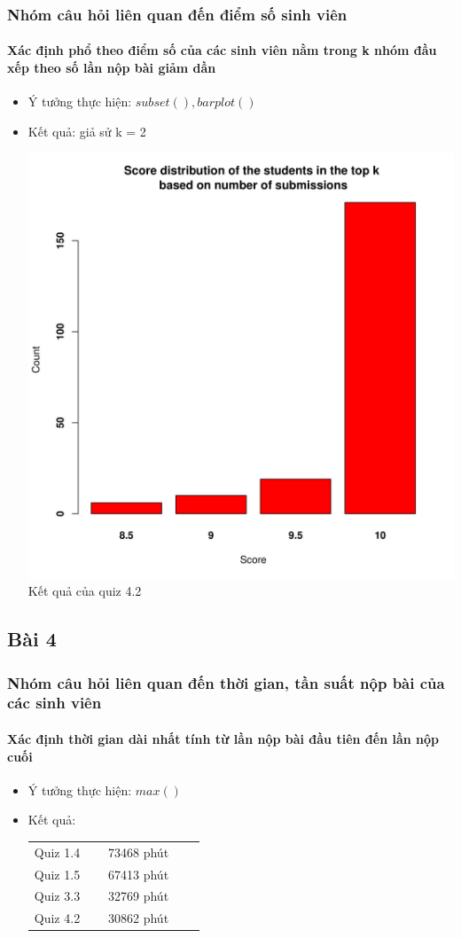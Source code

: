 \documentclass[english,10pt,table]{beamer}
\begin{document}
\frame
{
\frametitle{Nhóm câu hỏi liên quan đến điểm số sinh viên}
\framesubtitle{Xác định phổ theo điểm số của các sinh viên nằm trong k nhóm đầu xếp theo số lần nộp bài giảm dần}
\begin{itemize}
    \item Ý tưởng thực hiện: $subset(), barplot()$
    \item Kết quả: giả sử k = 2\\
    \begin{center}
        \includegraphics[width = 6 cm]{Images/img3-6-4.png}\\
        Kết quả của quiz 4.2
    \end{center}
\end{itemize}
}

\subsection{Bài 4}
\frame
{
\frametitle{Nhóm câu hỏi liên quan đến thời gian, tần suất nộp bài của các sinh viên}
\framesubtitle{Xác định thời gian dài nhất tính từ lần nộp bài đầu tiên đến lần nộp cuối}
\begin{itemize}
    \item Ý tưởng thực hiện: $max()$
    \item Kết quả:\\
    \begin{center}
        \begin{tabular}{l l c c c}
             Quiz 1.4 & $\;$ & 73468 phút\\
             Quiz 1.5 & $\;$ & 67413 phút\\
             Quiz 3.3 & $\;$ & 32769 phút\\
             Quiz 4.2 & $\;$ & 30862 phút
        \end{tabular}
    \end{center}
\end{itemize}
}
\end{document}
